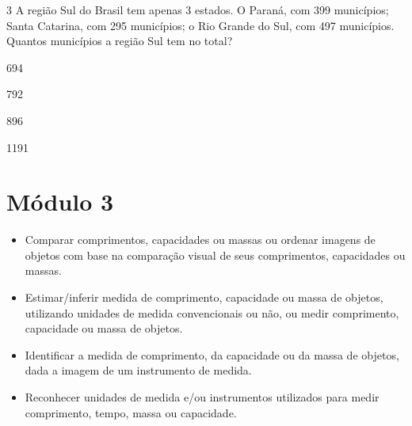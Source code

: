 \num{3} A região Sul do Brasil tem apenas 3 estados. O Paraná, com 399
municípios; Santa Catarina, com 295 municípios; o Rio Grande do Sul, com
497 municípios. Quantos municípios a região Sul tem no total?

\begin{minipage}{.5\textwidth}
\begin{escolha}
\item 694

\item 792

\item 896

\item 1191
\end{escolha}
\end{minipage}

\chapter{Módulo 3}



\begin{itemize}
\item Comparar comprimentos, capacidades ou massas ou ordenar imagens de
  objetos com base na comparação visual de seus comprimentos, capacidades ou massas.

\item Estimar/inferir medida de comprimento, capacidade ou massa de objetos,
  utilizando unidades de medida convencionais ou não, ou medir
  comprimento, capacidade ou massa de objetos.

\item Identificar a medida de comprimento, da capacidade ou da massa de
  objetos, dada a imagem de um instrumento de medida.

\item Reconhecer unidades de medida e/ou instrumentos utilizados para medir
  comprimento, tempo, massa ou capacidade.
\end{itemize}

